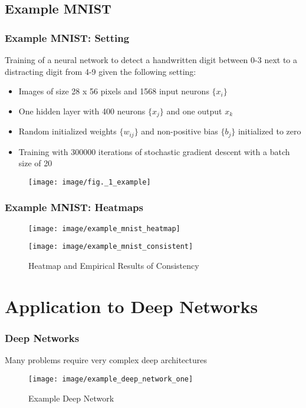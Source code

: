 \documentclass{beamer}
\begin{document}
\subsection[Example MINST]{Example MNIST}



\begin{frame}
\frametitle{Example MNIST: Setting}
\vspace{0.5cm}
Training of a neural network to detect a handwritten digit between 0-3 next to a distracting digit from 4-9 given the following setting:
\begin{itemize}
\item Images of size 28 x 56 pixels and 1568 input neurons $\{x_i\}$
\item One hidden layer with 400 neurons $\{x_j\}$ and one output $x_k$
\item Random initialized weights $\{w_{ij}\}$ and non-positive bias $\{b_j\}$ initialized to zero
\item Training with 300000 iterations of stochastic gradient descent with a batch size of 20 
\end{itemize}
\begin{figure}
\texttt{[image: image/fig.\_1\_example]}

\end{figure}
\end{frame}


\begin{frame}
\frametitle{Example MNIST: Heatmaps}
\vspace{0.5cm}
\begin{figure}
\texttt{[image: image/example\_mnist\_heatmap]}
\end{figure}

\begin{figure}
\texttt{[image: image/example\_mnist\_consistent]}
\vspace{-0.75cm}
\caption{Heatmap and Empirical Results of Consistency}
\end{figure}


\end{frame}



\section[Application to Deep Networks]{Application to Deep Networks}


\begin{frame}
\frametitle{Deep Networks}
Many problems require very complex deep architectures

\begin{figure}
\label{fig1}
\texttt{[image: image/example\_deep\_network\_one]}
\vspace{-0.25cm}
\caption{Example Deep Network}

\end{figure}

\vspace{-1cm}
\end{frame}
\end{document}
